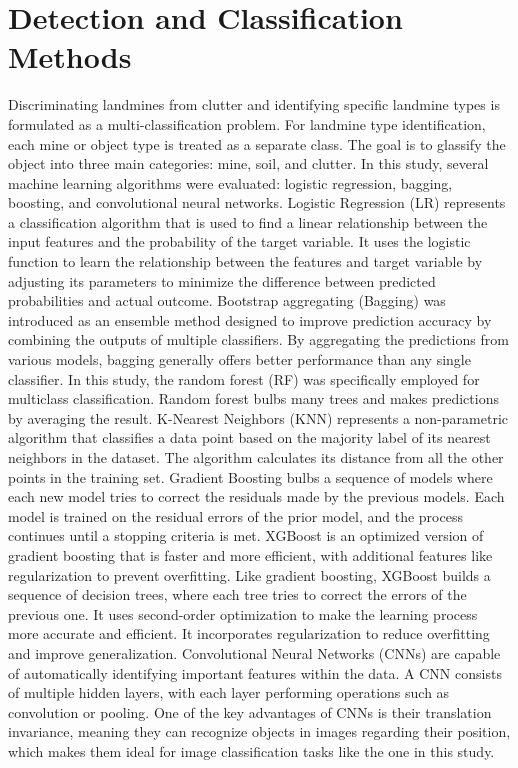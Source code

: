 \documentclass{ieeeaccess}
\begin{document}
\section{Detection and Classification Methods}
Discriminating landmines from clutter and identifying specific landmine types is formulated as a multi-classification problem. For landmine type identification, each mine or object type is treated as a separate class. The goal is to glassify the object into three main categories: mine, soil, and clutter. 
In this study, several machine learning algorithms were evaluated: logistic regression, bagging, boosting, and convolutional neural networks. 
Logistic Regression (LR) represents a classification algorithm that is used to find a linear relationship between the input features and the probability of the target variable. It uses the logistic function to learn the relationship between the features and target variable by adjusting its parameters to minimize the difference between predicted probabilities and actual outcome. 
Bootstrap aggregating (Bagging) was introduced as an ensemble method designed to improve prediction accuracy by combining the outputs of multiple classifiers. By aggregating the predictions from various models, bagging generally offers better performance than any single classifier. In this study, the random forest (RF) was specifically employed for multiclass classification. Random forest bulbs many trees and makes predictions by averaging the result. 
K-Nearest Neighbors (KNN) represents a non-parametric algorithm that classifies a data point based on the majority label of its nearest neighbors in the dataset. The algorithm calculates its distance from all the other points in the training set. 
Gradient Boosting bulbs a sequence of models where each new model tries to correct the residuals made by the previous models. Each model is trained on the residual errors of the prior model, and the process continues until a stopping criteria is met. 
XGBoost is an optimized version of gradient boosting that is faster and more efficient, with additional features like regularization to prevent overfitting. Like gradient boosting, XGBoost builds a sequence of decision trees, where each tree tries to correct the errors of the previous one. It uses second-order optimization to make the learning process more accurate and efficient. It incorporates regularization to reduce overfitting and improve generalization. 
Convolutional Neural Networks (CNNs) are capable of automatically identifying important features within the data. A CNN consists of  multiple hidden layers, with each layer performing operations such as convolution or pooling. One of the key advantages of CNNs is their translation invariance, meaning they can recognize objects in images regarding their position, which makes them ideal for image classification tasks like the one in this study. 
\end{document}
